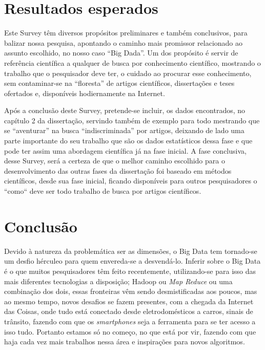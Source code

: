 \documentclass[conference,compsoc]{IEEEtran}
\begin{document}
\section{Resultados esperados}

Este Survey têm diversos propósitos preliminares e também conclusivos, para balizar nossa pesquisa, apontando o caminho
mais promissor relacionado ao assunto escolhido, no nosso caso “Big Dada”. Um dos propósito é servir de referência científica
a qualquer de busca por conhecimento científico, mostrando o trabalho que o pesquisador deve ter, o cuidado ao procurar 
esse conhecimento, sem contaminar-se na “floresta” de artigos científicos, dissertações e teses ofertados e, disponíveis
hodiernamente na Internet. 

Após a conclusão deste Survey, pretende-se incluir, os dados encontrados, no capítulo 2 da dissertação, servindo também 
de exemplo para todo mestrando que se “aventurar” na busca “indiscriminada” por artigos, deixando de lado uma parte 
importante do seu trabalho que são os dados estatísticos dessa fase e que pode ter assim uma abordagem científica já na 
fase inicial.
A fase conclusiva, desse Survey, será a certeza de que o melhor caminho escolhido para o desenvolvimento das outras
fases da dissertação foi baseado em métodos científicos, desde sua fase inicial, ficando disponíveis para outros pesquisadores 
o ``como`` deve ser todo trabalho de busca por artigos científicos.


\section{Conclusão}

Devido à natureza da problemática ser as dimensões, o Big Data tem tornado-se um desfio hérculeo para quem envereda-se a desvendá-lo.
Inferir sobre o Big Data é o que muitos pesquisadores têm feito recentemente, utilizando-se para isso das mais diferentes tecnologias a disposição; Hadoop ou \textit{Map Reduce} ou uma combinação dos dois, essas fronteiras vêm sendo desmistificadas aos poucos, mas ao mesmo tempo, novos desafios se fazem presentes, com a chegada da Internet das Coisas, onde tudo está conectado \cite{madeira}
desde eletrodomésticos \cite{mayumi} a carros, sinais de trânsito, fazendo com que os \textit{smartphones} seja a ferramenta para se ter acesso a isso tudo. \cite{singer}
Portanto estamos só no começo, no que está por vir, fazendo com que haja cada vez mais trabalhos nessa área e inspirações para novos algoritmos.
\end{document}
